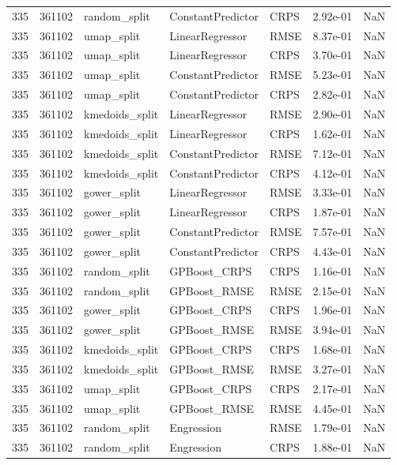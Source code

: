 \begin{tabular}{rrlllrr}
335 & 361102 & random\_split & ConstantPredictor & CRPS & 2.92e-01 & NaN \\
335 & 361102 & umap\_split & LinearRegressor & RMSE & 8.37e-01 & NaN \\
335 & 361102 & umap\_split & LinearRegressor & CRPS & 3.70e-01 & NaN \\
335 & 361102 & umap\_split & ConstantPredictor & RMSE & 5.23e-01 & NaN \\
335 & 361102 & umap\_split & ConstantPredictor & CRPS & 2.82e-01 & NaN \\
335 & 361102 & kmedoids\_split & LinearRegressor & RMSE & 2.90e-01 & NaN \\
335 & 361102 & kmedoids\_split & LinearRegressor & CRPS & 1.62e-01 & NaN \\
335 & 361102 & kmedoids\_split & ConstantPredictor & RMSE & 7.12e-01 & NaN \\
335 & 361102 & kmedoids\_split & ConstantPredictor & CRPS & 4.12e-01 & NaN \\
335 & 361102 & gower\_split & LinearRegressor & RMSE & 3.33e-01 & NaN \\
335 & 361102 & gower\_split & LinearRegressor & CRPS & 1.87e-01 & NaN \\
335 & 361102 & gower\_split & ConstantPredictor & RMSE & 7.57e-01 & NaN \\
335 & 361102 & gower\_split & ConstantPredictor & CRPS & 4.43e-01 & NaN \\
335 & 361102 & random\_split & GPBoost\_CRPS & CRPS & 1.16e-01 & NaN \\
335 & 361102 & random\_split & GPBoost\_RMSE & RMSE & 2.15e-01 & NaN \\
335 & 361102 & gower\_split & GPBoost\_CRPS & CRPS & 1.96e-01 & NaN \\
335 & 361102 & gower\_split & GPBoost\_RMSE & RMSE & 3.94e-01 & NaN \\
335 & 361102 & kmedoids\_split & GPBoost\_CRPS & CRPS & 1.68e-01 & NaN \\
335 & 361102 & kmedoids\_split & GPBoost\_RMSE & RMSE & 3.27e-01 & NaN \\
335 & 361102 & umap\_split & GPBoost\_CRPS & CRPS & 2.17e-01 & NaN \\
335 & 361102 & umap\_split & GPBoost\_RMSE & RMSE & 4.45e-01 & NaN \\
335 & 361102 & random\_split & Engression & RMSE & 1.79e-01 & NaN \\
335 & 361102 & random\_split & Engression & CRPS & 1.88e-01 & NaN \\

\end{tabular}
